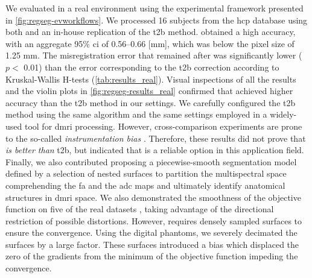 We evaluated \regseg{} in a real environment using the experimental framework presented
  in \autoref{fig:regseg-evworkflows}.
We processed 16 subjects from the \gls*{hcp} database using both \regseg{}
  and an in-house replication of the \acrfull*{t2b} method.
\Regseg{} obtained a high accuracy, with an aggregate 95\% \gls*{ci} of 0.56--0.66 [mm], which was
  below the pixel size of 1.25 mm.
The misregistration error that remained after \regseg{} was significantly lower ($p <$ 0.01) than the
  error corresponding to the \gls*{t2b} correction according to Kruskal-Wallis H-tests
  (\autoref{tab:results_real}).
Visual inspections of all the results  and the violin plots in
  \autoref{fig:regseg-results_real} confirmed that \regseg{} achieved higher accuracy
  than the \gls*{t2b} method in our settings.
We carefully configured the \gls*{t2b} method using the same algorithm and the
  same settings employed in a widely-used tool for \gls*{dmri} processing.
However, cross-comparison experiments are prone to the so-called \emph{instrumentation bias}
  \citep{tustison_instrumentation_2013}.
Therefore, these results did not prove that \regseg{} \emph{is better than} \gls*{t2b},
  but indicated that \regseg{} is a reliable option in this application field.
Finally, we also contributed proposing a piecewise-smooth segmentation model defined by
  a selection of nested surfaces to partition the multispectral space
  comprehending the \gls*{fa} and the \gls*{adc} maps and ultimately identify anatomical
  structures in \gls*{dmri} space.
We also demonstrated the smoothness of the objective function on five of the real datasets
  , taking advantage of the directional
  restriction of possible distortions.
However, \regseg{} requires densely sampled surfaces to ensure the convergence.
Using the digital phantoms, we severely decimated the surfaces by a large factor.
These surfaces introduced a bias which displaced the zero of the gradients from the
  minimum of the objective function impeding the convergence.

